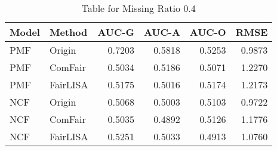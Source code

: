 \begin{table}
\centering
\caption{Table for Missing Ratio 0.4}
\label{tab:missing_0.4}
\begin{tabular}{llrrrr}
\toprule
Model &   Method &  AUC-G &  AUC-A &  AUC-O &   RMSE \\
\midrule
  PMF &   Origin & 0.7203 & 0.5818 & 0.5253 & 0.9873 \\
  PMF &  ComFair & 0.5034 & 0.5186 & 0.5071 & 1.2270 \\
  PMF & FairLISA & 0.5175 & 0.5016 & 0.5174 & 1.2173 \\
  NCF &   Origin & 0.5068 & 0.5003 & 0.5103 & 0.9722 \\
  NCF &  ComFair & 0.5035 & 0.4892 & 0.5126 & 1.1776 \\
  NCF & FairLISA & 0.5251 & 0.5033 & 0.4913 & 1.0760 \\
\bottomrule
\end{tabular}
\end{table}
